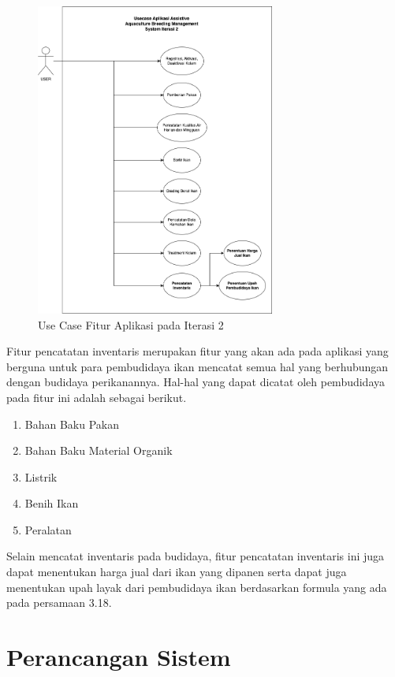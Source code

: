 \begin{figure}[H]
	\centering
	\includegraphics[width=0.7\textwidth]{gambar/akbar/usecase_iterasi_2.png}
	\caption{Use Case Fitur Aplikasi pada Iterasi 2}
\end{figure}

Fitur pencatatan inventaris merupakan fitur yang akan ada pada aplikasi yang berguna untuk para pembudidaya ikan mencatat semua hal yang berhubungan dengan budidaya perikanannya. Hal-hal yang dapat dicatat oleh pembudidaya pada fitur ini adalah sebagai berikut.

\begin{enumerate}
	\item Bahan Baku Pakan
	\item Bahan Baku Material Organik
	\item Listrik
	\item Benih Ikan
	\item Peralatan
\end{enumerate}

Selain mencatat inventaris pada budidaya, fitur pencatatan inventaris ini juga dapat menentukan harga jual dari ikan yang dipanen serta dapat juga menentukan upah layak dari pembudidaya ikan berdasarkan formula yang ada pada persamaan 3.18.

\section{Perancangan Sistem}

